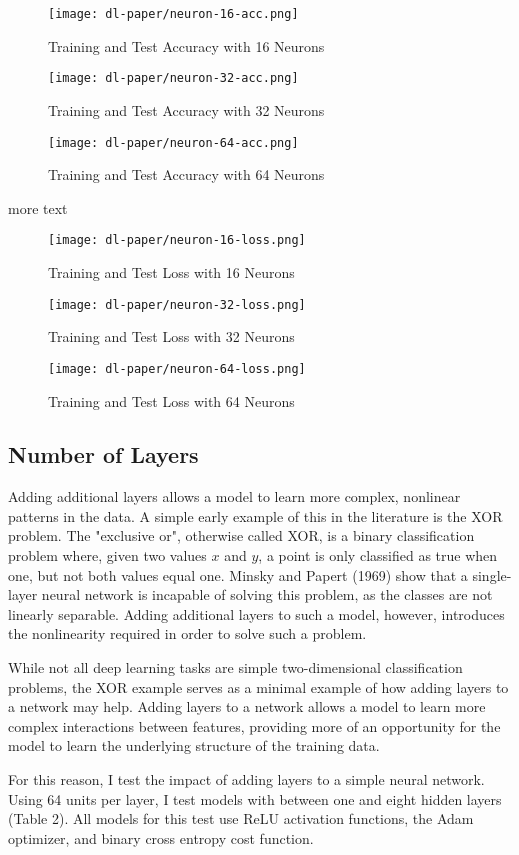 \documentclass[12pt]{article}  %
\theoremstyle{definition}
\theoremstyle{remark}
\begin{document}
\begin{figure}[!h]
  \texttt{[image: dl-paper/neuron-16-acc.png]}
  \caption{Training and Test Accuracy with 16 Neurons}\label{small-neuron}
\endminipage\hfill
{}
  \texttt{[image: dl-paper/neuron-32-acc.png]}
  \caption{Training and Test Accuracy with 32 Neurons}\label{med-neuron}
\endminipage\hfill
{}%
  \texttt{[image: dl-paper/neuron-64-acc.png]}
  \caption{Training and Test Accuracy with 64 Neurons}\label{large-neuron}
\endminipage
\end{figure}


\par more text 

\begin{figure}[!h]
  \texttt{[image: dl-paper/neuron-16-loss.png]}
  \caption{Training and Test Loss with 16 Neurons}\label{small-neuron-loss}
\endminipage\hfill
{}
  \texttt{[image: dl-paper/neuron-32-loss.png]}
  \caption{Training and Test Loss with 32 Neurons}\label{med-neuron-loss}
\endminipage\hfill
{}%
  \texttt{[image: dl-paper/neuron-64-loss.png]}
  \caption{Training and Test Loss with 64 Neurons}\label{large-neuron-loss}
\endminipage
\end{figure}

\subsection{Number of Layers}

\par Adding additional layers allows a model to learn more complex, nonlinear patterns in the data. A simple early example of this in the literature is the XOR problem. The "exclusive or", otherwise called XOR, is a binary classification problem where, given two values $x$ and $y$, a point is only classified as true when one, but not both values equal one. Minsky and Papert (1969) show that a single-layer neural network is incapable of solving this problem, as the classes are not linearly separable. Adding additional layers to such a model, however, introduces the nonlinearity required in order to solve such a problem. 
\par While not all deep learning tasks are simple two-dimensional classification problems, the XOR example serves as a minimal example of how adding layers to a network may help. Adding layers to a network allows a model to learn more complex interactions between features, providing more of an opportunity for the model to learn the underlying structure of the training data. 
\par For this reason, I test the impact of adding layers to a simple neural network. Using 64 units per layer, I test models with between one and eight hidden layers (Table 2). All models for this test use ReLU activation functions, the Adam optimizer, and binary cross entropy cost function. 
\end{document}
